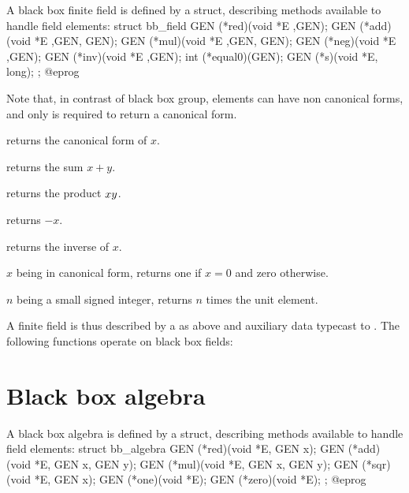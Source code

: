 A black box finite field is defined by a  struct, describing methods
available to handle field elements:
\bprog
  struct bb_field
  {
    GEN (*red)(void *E ,GEN);
    GEN (*add)(void *E ,GEN, GEN);
    GEN (*mul)(void *E ,GEN, GEN);
    GEN (*neg)(void *E ,GEN);
    GEN (*inv)(void *E ,GEN);
    int (*equal0)(GEN);
    GEN (*s)(void *E, long);
  };
@eprog

Note that, in contrast of black box group, elements can have non canonical forms, and
only  is required to return a canonical form.

 returns the canonical form of $x$.

 returns the sum $x+y$.

 returns the product $x\*y$.

 returns $-x$.

 returns the inverse of $x$.

 $x$ being in canonical form, returns one if $x=0$ and zero otherwise.

 $n$ being a small signed integer, returns $n$ times the unit element.

A finite field is thus described by a  as above and auxiliary
data typecast to . The following functions operate on black box
fields:









\section{Black box algebra}

A black box algebra is defined by a  struct, describing methods
available to handle field elements:
\bprog
struct bb_algebra
{
  GEN (*red)(void *E, GEN x);
  GEN (*add)(void *E, GEN x, GEN y);
  GEN (*mul)(void *E, GEN x, GEN y);
  GEN (*sqr)(void *E, GEN x);
  GEN (*one)(void *E);
  GEN (*zero)(void *E);
};
@eprog

